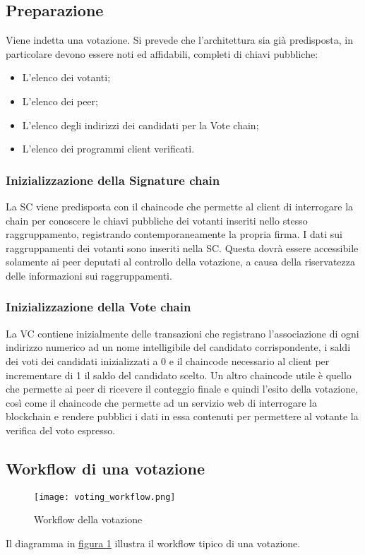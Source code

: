 	\subsection{Preparazione}
		Viene indetta una votazione. Si prevede che l'architettura sia già predisposta, in particolare devono essere noti ed affidabili, completi di chiavi pubbliche:
		\begin{itemize}
			\item L'elenco dei votanti;
			\item L'elenco dei peer;
			\item L'elenco degli indirizzi dei candidati per la Vote chain;
			\item L'elenco dei programmi client verificati.
		\end{itemize}
		\subsubsection{Inizializzazione della Signature chain}
			La SC viene predisposta con il chaincode che permette al client di interrogare la chain per conoscere le chiavi pubbliche dei votanti inseriti nello stesso raggruppamento, registrando contemporaneamente la propria firma. I dati sui raggruppamenti dei votanti sono inseriti nella SC. Questa dovrà essere accessibile solamente ai peer deputati al controllo della votazione, a causa della riservatezza delle informazioni sui raggruppamenti.
		\subsubsection{Inizializzazione della Vote chain}
			La VC contiene inizialmente delle transazioni che registrano l'associazione di ogni indirizzo numerico ad un nome intelligibile del candidato corrispondente, i saldi dei voti dei candidati inizializzati a 0 e il chaincode necessario al client per incrementare di 1 il saldo del candidato scelto. Un altro chaincode utile è quello che permette ai peer di ricevere il conteggio finale e quindi l'esito della votazione, così come il chaincode che permette ad un servizio web di interrogare la blockchain e rendere pubblici i dati in essa contenuti per permettere al votante la verifica del voto espresso.
	
	\subsection{Workflow di una votazione}
		\begin{figure}[ht]
			\centering
			\texttt{[image: voting\_workflow.png]}
			\caption{Workflow della votazione}
			\label{fig:voting_workflow}
		\end{figure}
		Il diagramma in \hyperref[fig:voting_workflow]{figura \ref*{fig:voting_workflow}} illustra il workflow tipico di una votazione.
